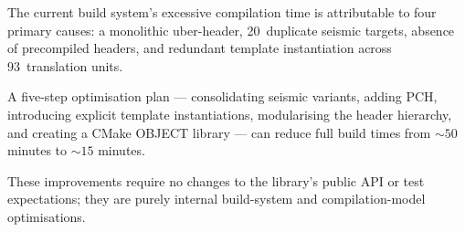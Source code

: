 The current build system's excessive compilation time is attributable
to four primary causes: a monolithic uber-header, 20~duplicate
seismic targets, absence of precompiled headers, and redundant
template instantiation across 93~translation units.

A five-step optimisation plan --- consolidating seismic variants,
adding PCH, introducing explicit template instantiations,
modularising the header hierarchy, and creating a CMake OBJECT
library --- can reduce full build times from ${\sim}50$ minutes to
${\sim}15$ minutes.

These improvements require no changes to the library's public API
or test expectations; they are purely internal build-system
and compilation-model optimisations.
